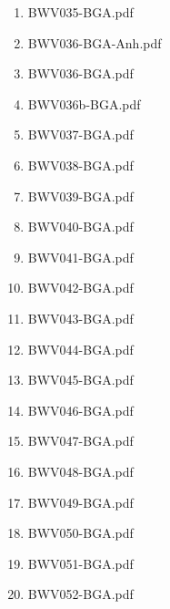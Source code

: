 \documentclass[11pt]{article}
\begin{document}
\begin{enumerate}
\begin{enumerate}
\begin{enumerate}
\item BWV035-BGA.pdf
\label{sec-1-1-1-1-44-6-7-1-42}

\item BWV036-BGA-Anh.pdf
\label{sec-1-1-1-1-44-6-7-1-43}

\item BWV036-BGA.pdf
\label{sec-1-1-1-1-44-6-7-1-44}

\item BWV036b-BGA.pdf
\label{sec-1-1-1-1-44-6-7-1-45}

\item BWV037-BGA.pdf
\label{sec-1-1-1-1-44-6-7-1-46}

\item BWV038-BGA.pdf
\label{sec-1-1-1-1-44-6-7-1-47}

\item BWV039-BGA.pdf
\label{sec-1-1-1-1-44-6-7-1-48}

\item BWV040-BGA.pdf
\label{sec-1-1-1-1-44-6-7-1-49}

\item BWV041-BGA.pdf
\label{sec-1-1-1-1-44-6-7-1-50}

\item BWV042-BGA.pdf
\label{sec-1-1-1-1-44-6-7-1-51}

\item BWV043-BGA.pdf
\label{sec-1-1-1-1-44-6-7-1-52}

\item BWV044-BGA.pdf
\label{sec-1-1-1-1-44-6-7-1-53}

\item BWV045-BGA.pdf
\label{sec-1-1-1-1-44-6-7-1-54}

\item BWV046-BGA.pdf
\label{sec-1-1-1-1-44-6-7-1-55}

\item BWV047-BGA.pdf
\label{sec-1-1-1-1-44-6-7-1-56}

\item BWV048-BGA.pdf
\label{sec-1-1-1-1-44-6-7-1-57}

\item BWV049-BGA.pdf
\label{sec-1-1-1-1-44-6-7-1-58}

\item BWV050-BGA.pdf
\label{sec-1-1-1-1-44-6-7-1-59}

\item BWV051-BGA.pdf
\label{sec-1-1-1-1-44-6-7-1-60}

\item BWV052-BGA.pdf
\label{sec-1-1-1-1-44-6-7-1-61}


\end{enumerate}
\end{enumerate}
\end{enumerate}
\end{document}
